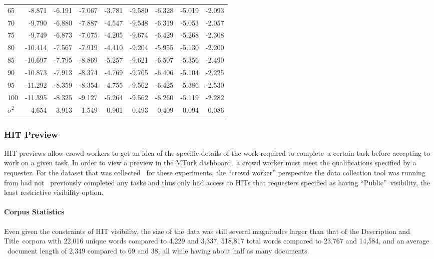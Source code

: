 \documentclass[letterpaper,12pt]{article}
\begin{document}
\begin{table}
\begin{center}
\begin{tabular}{|l|rr|rr|rr|rr|}
			65  &  -8.871 & -6.191 & -7.067 & -3.781 &  -9.580 & -6.328 & -5.019 & -2.093 \\
			70  &  -9.790 & -6.880 & -7.887 & -4.547 &  -9.548 & -6.319 & -5.053 & -2.057 \\
			75  &  -9.749 & -6.873 & -7.675 & -4.205 &  -9.674 & -6.429 & -5.268 & -2.308 \\
			80  & -10.414 & -7.567 & -7.919 & -4.410 &  -9.204 & -5.955 & -5.130 & -2.200 \\
			85  & -10.697 & -7.795 & -8.869 & -5.257 &  -9.621 & -6.507 & -5.356 & -2.490 \\
			90  & -10.873 & -7.913 & -8.374 & -4.769 &  -9.705 & -6.406 & -5.104 & -2.225 \\
			95  & -11.292 & -8.359 & -8.354 & -4.755 &  -9.562 & -6.425 & -5.386 & -2.530 \\
			100 & -11.395 & -8.325 & -9.127 & -5.264 &  -9.562 & -6.260 & -5.119 & -2.282 \\
			\hline
			$\sigma^2$ & 4.654 & 3.913 & 1.549 & 0.901 & 0.493 & 0.409 & 0.094 & 0.086 \\ 
			\hline
			\end{tabular}
	\end{center}
\end{table}



\newpage
\subsubsection{HIT Preview}
HIT previews allow crowd workers to get an idea of the specific details of the work required to complete\
a certain task before accepting to work on a given task. In order to view a preview in the MTurk dashboard,\
a crowd worker must meet the qualifications specified by a requester. For the dataset that was collected \
for these experiments, the ``crowd worker'' perspective the data collection tool was running from had not \
previously completed any tasks and thus only had access to HITs that requesters specified as having ``Public''\
visibility, the least restrictive visibility option.



\paragraph{Corpus Statistics}
Even given the constraints of HIT visibility, the size of the data was still several magnitudes larger than that of the Description and Title\
corpora with 22,016 unique words compared to 4,229 and 3,337, 518,817 total words compared to 23,767 and 14,584, and an average \
document length of 2,349 compared to 69 and 38, all while having about half as many documents.
\end{document}
